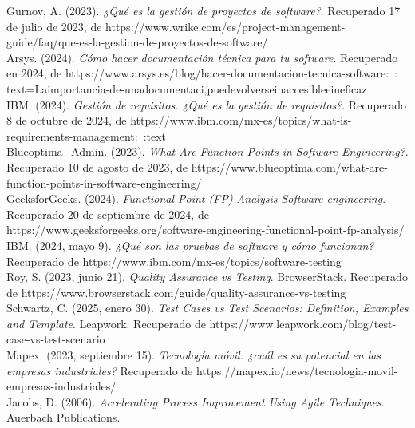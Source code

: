 \documentclass[12pt,letterpaper,spanish, xcolor=table]{report}
\numberwithin{figure}{subsection}
\begin{document}
	Gurnov, A. (2023). \textit{¿Qué es la gestión de proyectos de software?}. Recuperado 17 de julio de 2023, de https://www.wrike.com/es/project-management-guide/faq/que-es-la-gestion-de-proyectos-de-software/\\
	
	Arsys. (2024). \textit{Cómo hacer documentación técnica para tu software}. Recuperado en 2024, de https://www.arsys.es/blog/hacer-documentacion-tecnica-software:~:
	text=Laimportancia-de-unadocumentaci,puedevolverseinaccesibleeineficaz\\
	
	IBM. (2024). \textit{Gestión de requisitos. ¿Qué es la gestión de requisitos?}. Recuperado 8 de octubre de 2024, de https://www.ibm.com/mx-es/topics/what-is-requirements-management:~:text\\
	
	Blueoptima\_Admin. (2023). \textit{What Are Function Points in Software Engineering?}. Recuperado 10 de agosto de 2023, de https://www.blueoptima.com/what-are-function-points-in-software-engineering/\\
	
	GeeksforGeeks. (2024). \textit{Functional Point (FP) Analysis Software engineering}. Recuperado 20 de septiembre de 2024, de https://www.geeksforgeeks.org/software-engineering-functional-point-fp-analysis/\\
	
	IBM. (2024, mayo 9). \textit{¿Qué son las pruebas de software y cómo funcionan?} Recuperado de https://www.ibm.com/mx-es/topics/software-testing\\
	
	Roy, S. (2023, junio 21). \textit{Quality Assurance vs Testing}. BrowserStack. Recuperado de https://www.browserstack.com/guide/quality-assurance-vs-testing\\
	
	Schwartz, C. (2025, enero 30). \textit{Test Cases vs Test Scenarios: Definition, Examples and Template}. Leapwork. Recuperado de https://www.leapwork.com/blog/test-case-vs-test-scenario\\
	
	Mapex. (2023, septiembre 15). \textit{Tecnología móvil: ¿cuál es su potencial en las empresas industriales?} Recuperado de https://mapex.io/news/tecnologia-movil-empresas-industriales/\\
	
	Jacobs, D. (2006). \textit{Accelerating Process Improvement Using Agile Techniques}. Auerbach Publications.\\
	
\end{document}
